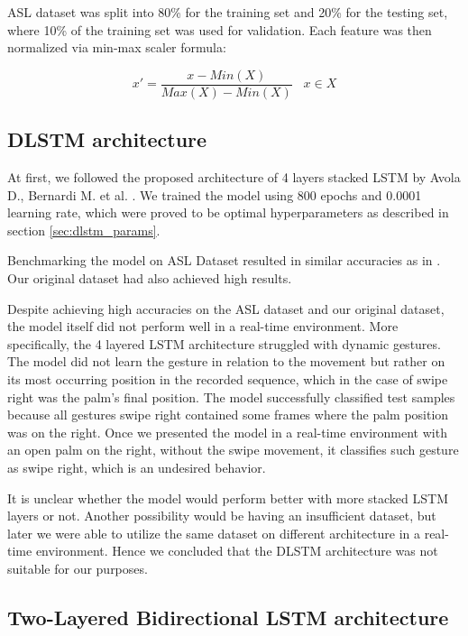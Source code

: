 ASL dataset was split into 80\% for the training set and 20\% for the testing set, where 10\% of the training set was used for validation.  Each feature was then normalized via min-max scaler formula:

\begin{equation}
    { x' = \frac{x - Min(X)}{Max(X)-Min(X)}\;\;\; x \in X}
\end{equation}

\subsection{DLSTM architecture}

At first, we followed the proposed architecture of 4 layers stacked LSTM by Avola D., Bernardi M. et al. \cite{avola}. We trained the model using 800 epochs and 0.0001 learning rate, which were proved to be optimal hyperparameters as described in section \ref{sec:dlstm_params}.

Benchmarking the model on ASL Dataset resulted in similar accuracies as in \cite{avola}. Our original dataset had also achieved high results.

Despite achieving high accuracies on the ASL dataset and our original dataset, the model itself did not perform well in a real-time environment. More specifically, the 4 layered LSTM architecture struggled with dynamic gestures. The model did not learn the gesture in relation to the movement but rather on its most occurring position in the recorded sequence, which in the case of swipe right was the palm's final position. The model successfully classified test samples because all gestures swipe right contained some frames where the palm position was on the right. Once we presented the model in a real-time environment with an open palm on the right, without the swipe movement, it classifies such gesture as swipe right, which is an undesired behavior. 

It is unclear whether the model would perform better with more stacked LSTM layers or not. Another possibility would be having an insufficient dataset, but later we were able to utilize the same dataset on different architecture in a real-time environment. Hence we concluded that the DLSTM architecture was not suitable for our purposes.

\subsection{Two-Layered Bidirectional LSTM architecture}

